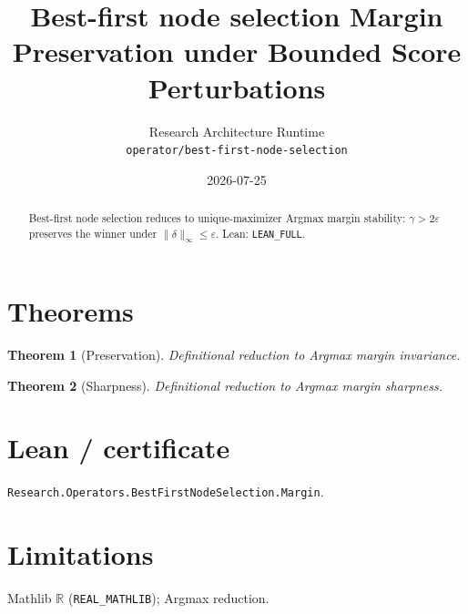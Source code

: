 \documentclass[11pt]{article}
\title{Best-first node selection Margin Preservation under Bounded Score Perturbations}
\author{Research Architecture Runtime \\ \texttt{operator/best-first-node-selection}}
\date{2026-07-25}
\newtheorem{theorem}{Theorem}
\begin{document}
\maketitle
\begin{abstract}
Best-first node selection reduces to unique-maximizer Argmax margin stability: $\gamma>2\varepsilon$
preserves the winner under $\|\delta\|_\infty\le\varepsilon$. Lean: \texttt{LEAN\_FULL}.
\end{abstract}
\section{Theorems}
\begin{theorem}[Preservation]
Definitional reduction to Argmax margin invariance.
\end{theorem}
\begin{theorem}[Sharpness]
Definitional reduction to Argmax margin sharpness.
\end{theorem}
\section{Lean / certificate}
\texttt{Research.Operators.BestFirstNodeSelection.Margin}.
\section{Limitations}
Mathlib $\mathbb{R}$ (\texttt{REAL\_MATHLIB}); Argmax reduction.
\end{document}

